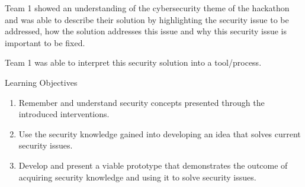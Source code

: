 Team 1 showed an understanding of the cybersecurity theme of the hackathon and was able to describe their solution by highlighting the security issue to be addressed, how the solution addresses this issue and why this security issue is important to be fixed.

Team 1 was able to interpret this security solution into a tool/process.


Learning Objectives

\begin{enumerate}
    \item Remember and understand security concepts presented through the introduced interventions.
    \item Use the security knowledge gained into developing an idea that solves current security issues.
    \item Develop and present a viable prototype that demonstrates the outcome of acquiring security knowledge and using it to solve security issues.
\end{enumerate}

